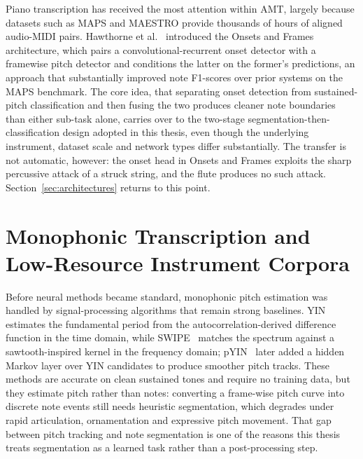 Piano transcription has received the most attention within AMT, largely because datasets such as MAPS and MAESTRO provide thousands of hours of aligned audio-MIDI pairs. Hawthorne et al.~\cite{ref4} introduced the Onsets and Frames architecture, which pairs a convolutional-recurrent onset detector with a framewise pitch detector and conditions the latter on the former's predictions, an approach that substantially improved note F1-scores over prior systems on the MAPS benchmark. The core idea, that separating onset detection from sustained-pitch classification and then fusing the two produces cleaner note boundaries than either sub-task alone, carries over to the two-stage segmentation-then-classification design adopted in this thesis, even though the underlying instrument, dataset scale and network types differ substantially. The transfer is not automatic, however: the onset head in Onsets and Frames exploits the sharp percussive attack of a struck string, and the flute produces no such attack. Section~\ref{sec:architectures} returns to this point.

\section{Monophonic Transcription and Low-Resource Instrument Corpora}
\label{sec:mono}

Before neural methods became standard, monophonic pitch estimation was handled by signal-processing algorithms that remain strong baselines. YIN~\cite{ref5} estimates the fundamental period from the autocorrelation-derived difference function in the time domain, while SWIPE~\cite{ref6} matches the spectrum against a sawtooth-inspired kernel in the frequency domain; pYIN~\cite{ref7} later added a hidden Markov layer over YIN candidates to produce smoother pitch tracks. These methods are accurate on clean sustained tones and require no training data, but they estimate pitch rather than notes: converting a frame-wise pitch curve into discrete note events still needs heuristic segmentation, which degrades under rapid articulation, ornamentation and expressive pitch movement. That gap between pitch tracking and note segmentation is one of the reasons this thesis treats segmentation as a learned task rather than a post-processing step.

